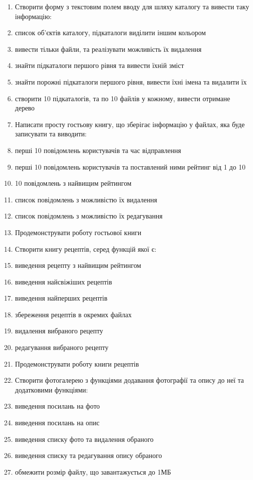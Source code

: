 \begin{enumerate}
\item[]Створити форму з текстовим полем вводу для шляху каталогу та вивести таку інформацію: 
\item список об'єктів каталогу, підкаталоги виділити іншим кольором
\item вивести тільки файли, та реалізувати можливість їх видалення
\item знайти підкаталоги першого рівня та вивести їхній зміст
\item знайти порожні підкаталоги першого рівня, вивести їхні імена та видалити їх
\item створити 10 підкаталогів, та по 10 файлів у кожному, вивести отримане дерево
\item []Написати просту гостьову книгу, що зберігає інформацію у файлах, яка буде записувати та виводити:
\item перші 10 повідомлень користувачів та час відправлення
\item перші 10 повідомлень користувачів та поставлений ними рейтинг від 1 до 10
\item 10 повідомлень з найвищим рейтингом
\item список повідомлень з можливістю їх видалення
\item список повідомлень з можливістю їх редагування
\item[]Продемонструвати роботу гостьової книги 
\item[]Створити книгу рецептів, серед функцій якої є: 
\item виведення рецепту з найвищим рейтингом
\item виведення найсвіжіших рецептів
\item виведення найперших рецептів
\item збереження рецептів в окремих файлах
\item видалення вибраного рецепту
\item редагування вибраного рецепту
\item[]Продемонструвати роботу книги рецептів 
\item[]Створити фотогалерею з функціями додавання фотографії та опису до неї та додатковими функціями: 
\item виведення посилань на фото
\item виведення посилань на опис
\item виведення списку фото та видалення обраного
\item виведення списку та редагування опису обраного
\item обмежити розмір файлу, що завантажується до 1МБ

\end{enumerate}
